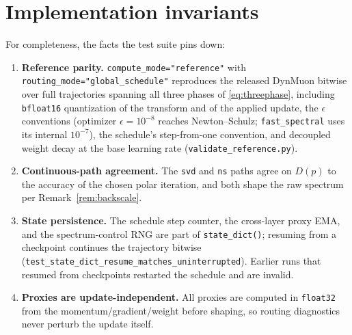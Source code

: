 \documentclass{article}
\begin{document}
\section{Implementation invariants}

For completeness, the facts the test suite pins down:
\begin{enumerate}
\item \textbf{Reference parity.} \texttt{compute\_mode="reference"} with
\texttt{routing\_mode="global\_schedule"} reproduces the released DynMuon
bitwise over full trajectories spanning all three phases of
\eqref{eq:threephase}, including \texttt{bfloat16} quantization of the
transform and of the applied update, the $\epsilon$ conventions
(optimizer $\epsilon = 10^{-8}$ reaches Newton--Schulz;
\texttt{fast\_spectral} uses its internal $10^{-7}$), the schedule's
step-from-one convention, and decoupled weight decay at the base learning
rate (\texttt{validate\_reference.py}).
\item \textbf{Continuous-path agreement.} The \texttt{svd} and \texttt{ns}
paths agree on $D(p)$ to the accuracy of the chosen polar iteration, and both
shape the raw spectrum per Remark~\ref{rem:backscale}.
\item \textbf{State persistence.} The schedule step counter, the cross-layer
proxy EMA, and the spectrum-control RNG are part of
\texttt{state\_dict()}; resuming from a checkpoint continues the trajectory
bitwise (\texttt{test\_state\_dict\_resume\_matches\_uninterrupted}). Earlier
runs that resumed from checkpoints restarted the schedule and are invalid.
\item \textbf{Proxies are update-independent.} All proxies are computed in
\texttt{float32} from the momentum/gradient/weight before shaping, so
routing diagnostics never perturb the update itself.
\end{enumerate}
\end{document}
